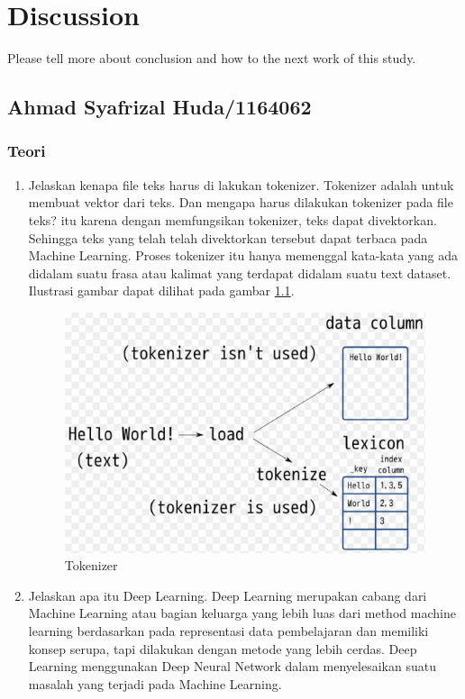 \chapter{Discussion}
Please tell more about conclusion and how to the next work of this study.

\section{Ahmad Syafrizal Huda/1164062}
\subsection{Teori}
\begin{enumerate}
\item Jelaskan kenapa file teks harus di lakukan tokenizer.
\subitem Tokenizer adalah untuk membuat vektor dari teks. Dan mengapa harus dilakukan tokenizer pada file teks? itu karena dengan memfungsikan tokenizer, teks dapat divektorkan. Sehingga teks yang telah telah divektorkan tersebut dapat terbaca pada Machine Learning. Proses tokenizer itu hanya memenggal kata-kata yang ada didalam suatu frasa atau kalimat yang terdapat didalam suatu text dataset. Ilustrasi gambar dapat dilihat pada gambar \ref{c7_1}.
\begin{figure}[!htbp]
	\centerline{\includegraphics[width=1\textwidth]{figures/huda/chapter7/1.JPG}}
	\caption{Tokenizer}
	\label{c7_1}
\end{figure}
\item Jelaskan apa itu Deep Learning.
\subitem Deep Learning merupakan cabang dari Machine Learning atau bagian keluarga yang lebih luas dari method machine learning berdasarkan pada representasi data pembelajaran dan memiliki konsep serupa, tapi dilakukan dengan metode yang lebih cerdas. Deep Learning menggunakan Deep Neural Network dalam menyelesaikan suatu masalah yang terjadi pada Machine Learning.

\end{enumerate}
